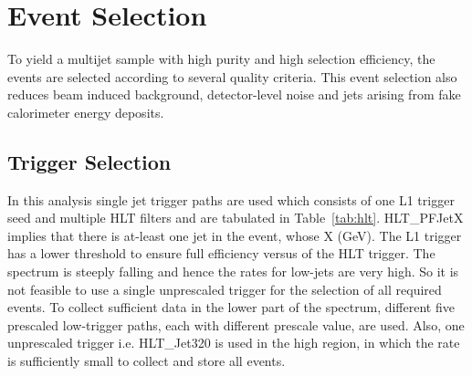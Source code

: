 \section{Event Selection}
To yield a multijet sample with high purity and high selection efficiency, the events are selected according to several quality criteria. This event selection also reduces beam induced background, detector-level noise and jets arising from fake calorimeter energy deposits. 

\subsection{Trigger Selection}

In this analysis single jet trigger paths are used which consists of one L1 trigger seed and multiple HLT filters and are tabulated in Table~\ref{tab:hlt}. HLT\_PFJetX implies that there is at-least one jet in the event, whose \pt \gr X (GeV). The L1 trigger has a lower threshold to ensure full efficiency versus \pt of the HLT trigger. The \pt spectrum is steeply falling and hence the rates for low-\pt jets are very high. So it is not feasible to use a single unprescaled trigger for the selection of all required events. To collect sufficient data in the lower part of the \pt spectrum, different five prescaled low-\pt trigger paths, each with different prescale value, are used. Also, one unprescaled trigger i.e. HLT\_Jet320 is used in the high \pt region, in which the rate is sufficiently small to collect and store all events. 


